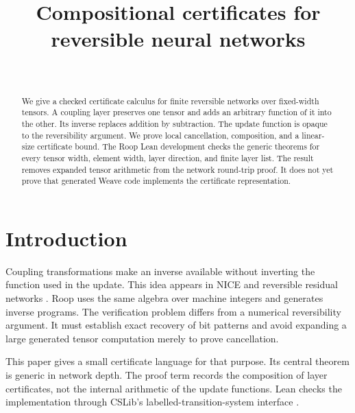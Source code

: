 \documentclass[aop,preprint]{../aop-template/imsart}
\theoremstyle{definition}
\begin{document}
\begin{frontmatter}
\title{Compositional certificates for reversible neural networks}

\begin{aug}
\author{~}
\end{aug}

\begin{abstract}
We give a checked certificate calculus for finite reversible networks over fixed-width tensors. A coupling layer preserves one tensor and adds an arbitrary function of it into the other. Its inverse replaces addition by subtraction. The update function is opaque to the reversibility argument. We prove local cancellation, composition, and a linear-size certificate bound. The Roop Lean development checks the generic theorems for every tensor width, element width, layer direction, and finite layer list. The result removes expanded tensor arithmetic from the network round-trip proof. It does not yet prove that generated Weave code implements the certificate representation.
\end{abstract}

\begin{keyword}[class=MSC]
\end{keyword}

\begin{keyword}
\end{keyword}

\end{frontmatter}

\section{Introduction}

Coupling transformations make an inverse available without inverting the function used in the update. This idea appears in NICE \cite{dinh2015nice} and reversible residual networks \cite{gomez2017revnet}. Roop uses the same algebra over machine integers and generates inverse programs. The verification problem differs from a numerical reversibility argument. It must establish exact recovery of bit patterns and avoid expanding a large generated tensor computation merely to prove cancellation.

This paper gives a small certificate language for that purpose. Its central theorem is generic in network depth. The proof term records the composition of layer certificates, not the internal arithmetic of the update functions. Lean checks the implementation through CSLib's labelled-transition-system interface \cite{demoura2021lean4,henson2026cslib}.
\end{document}
